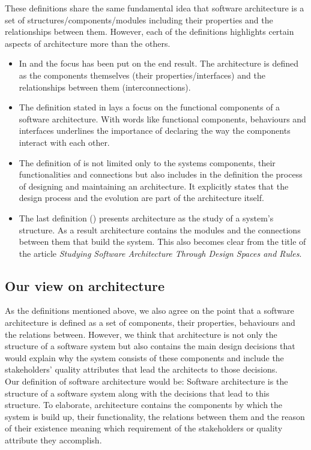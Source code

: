 \documentclass{article}
\begin{document}
These definitions share the same fundamental idea that software architecture
is a set of structures/components/modules including their properties and the
relationships between them. However, each of the definitions highlights certain
aspects of architecture more than the others. 
\begin{itemize}
\item In \cite{clemens} and \cite{hayesroth} the focus has been put on the end result. The architecture 
is defined as the components themselves (their properties/interfaces) and the relationships between them (interconnections).
\item The definition stated in \cite{hayesroth} lays a focus on the functional components of a software architecture. With words like functional components, 
behaviours and interfaces underlines the importance of declaring the way the components interact with each other.
\item The definition of \cite{IEEE1471} is not limited only to the systems components, their functionalities and connections but also includes in the definition the 
process of designing and maintaining an architecture. It explicitly states that the design process and the evolution are part of the architecture itself.
\item The last definition (\cite{lane90}) presents architecture as the study of a system's structure. As a result architecture contains the modules and the connections between them that build the system. This also becomes clear
from the title of the article \emph{Studying Software Architecture Through Design Spaces and Rules}.

\end{itemize}

\subsection{Our view on architecture}
As the definitions mentioned above, we also agree on the point that a software architecture is defined as a set of components, their properties, behaviours and the relations
between. However, we think that architecture is not only the structure of a software system but also contains the main design decisions that would explain why the system consists of 
these components and include the stakeholders' quality attributes that lead the architects to those decisions. \\ 

Our definition of software architecture would be:
Software architecture is the structure of a software system along with the decisions that lead to this structure. To elaborate, architecture contains the components by which
the system is build up, their functionality, the relations between them and the reason of their existence meaning which requirement of the stakeholders or quality attribute they accomplish. 
\end{document}
